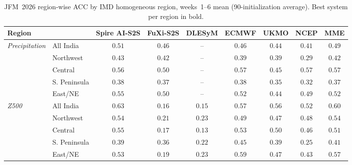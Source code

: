     \begin{table}[t]\centering
    \footnotesize
    \setlength{\tabcolsep}{3pt}
    \caption{JFM~2026 region-wise ACC by IMD homogeneous region, weeks~1--6 mean (90-initialization average). Best system per region in bold.}
    \label{tab:reg_pcc}
    \begin{tabular}{llccccccc}\toprule
    Region & & Spire AI-S2S & FuXi-S2S & DLESyM & ECMWF & UKMO & NCEP & MME \\
    \midrule
    \multirow{5}{*}{\emph{Precipitation}} & All India    & $\mathbf{0.51}$ & $0.46$ & -- & $0.46$ & $0.44$ & $0.41$ & $0.49$ \\
 & Northwest    & $\mathbf{0.43}$ & $0.42$ & -- & $0.39$ & $0.39$ & $0.29$ & $0.42$ \\
 & Central      & $0.56$ & $0.50$ & -- & $0.57$ & $0.45$ & $\mathbf{0.57}$ & $0.57$ \\
 & S. Peninsula & $0.38$ & $0.37$ & -- & $\mathbf{0.38}$ & $0.35$ & $0.32$ & $0.37$ \\
 & East/NE      & $\mathbf{0.55}$ & $0.50$ & -- & $0.52$ & $0.44$ & $0.49$ & $0.52$ \\
\midrule
\multirow{5}{*}{\emph{Z500}} & All India    & $\mathbf{0.63}$ & $0.16$ & $0.15$ & $0.57$ & $0.56$ & $0.52$ & $0.60$ \\
 & Northwest    & $\mathbf{0.54}$ & $0.21$ & $0.23$ & $0.49$ & $0.47$ & $0.48$ & $0.54$ \\
 & Central      & $\mathbf{0.55}$ & $0.17$ & $0.13$ & $0.53$ & $0.50$ & $0.46$ & $0.51$ \\
 & S. Peninsula & $0.39$ & $0.36$ & $0.22$ & $\mathbf{0.45}$ & $0.39$ & $0.25$ & $0.41$ \\
 & East/NE      & $0.53$ & $0.19$ & $0.23$ & $\mathbf{0.59}$ & $0.47$ & $0.43$ & $0.57$ \\
    \bottomrule
    \end{tabular}\end{table}

